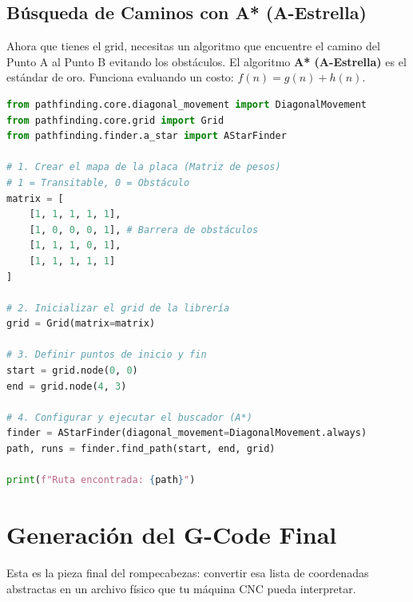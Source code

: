 \documentclass[12pt, a4paper]{article}
\begin{document}
\subsection{Búsqueda de Caminos con A* (A-Estrella)}

Ahora que tienes el grid, necesitas un algoritmo que encuentre el camino del Punto A al Punto B evitando los obstáculos. El algoritmo \textbf{A* (A-Estrella)} es el estándar de oro. Funciona evaluando un costo: $f(n) = g(n) + h(n)$.

\begin{lstlisting}[language=Python, caption=Búsqueda de camino con la librería `pathfinding`]
from pathfinding.core.diagonal_movement import DiagonalMovement
from pathfinding.core.grid import Grid
from pathfinding.finder.a_star import AStarFinder

# 1. Crear el mapa de la placa (Matriz de pesos)
# 1 = Transitable, 0 = Obstáculo
matrix = [
    [1, 1, 1, 1, 1],
    [1, 0, 0, 0, 1], # Barrera de obstáculos
    [1, 1, 1, 0, 1],
    [1, 1, 1, 1, 1]
]

# 2. Inicializar el grid de la librería
grid = Grid(matrix=matrix)

# 3. Definir puntos de inicio y fin
start = grid.node(0, 0)
end = grid.node(4, 3)

# 4. Configurar y ejecutar el buscador (A*)
finder = AStarFinder(diagonal_movement=DiagonalMovement.always)
path, runs = finder.find_path(start, end, grid)

print(f"Ruta encontrada: {path}")
\end{lstlisting}

\section{Generación del G-Code Final}

Esta es la pieza final del rompecabezas: convertir esa lista de coordenadas abstractas en un archivo físico que tu máquina CNC pueda interpretar.
\end{document}
